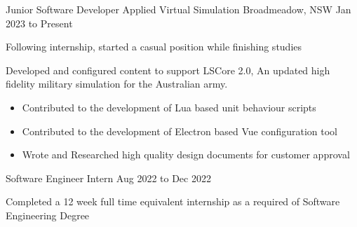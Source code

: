 

\begin{cventries}

  \cventry
    {Junior Software Developer} %
    { Applied Virtual Simulation} %
    {Broadmeadow, NSW} %
    {Jan 2023 to Present} %
    {
      \begin{cvitems} %
        \item Following internship, started a casual position while finishing studies
         \item Developed and configured content to support LSCore 2.0, An updated high fidelity military simulation for the Australian army.
         \begin{itemize}
             \item Contributed to the development of Lua based unit behaviour scripts
             \item Contributed to the development of Electron based Vue configuration tool
             \item Wrote and Researched high quality design documents for customer approval
         \end{itemize}
      \end{cvitems}
    }

  \cventry
    {Software Engineer Intern}
    {}
    {}
    {Aug 2022 to Dec 2022}
    {
      \begin{cvitems} %
        \item Completed a 12 week full time equivalent internship as a required of Software Engineering Degree
      \end{cvitems}
    }


\end{cventries}
